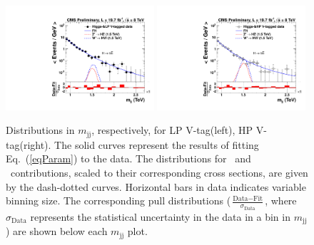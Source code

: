 \begin{figure}[th!b]
\begin{center}
\includegraphics[width=0.49\textwidth]{EXO-14-009/HbbZqqfigs/FITS/HbbVqqFitAndPullLowP.pdf}
\includegraphics[width=0.49\textwidth]{EXO-14-009/HbbZqqfigs/FITS/HbbVqqFitAndPullHighP.pdf}
\end{center}
\caption{Distributions in $m_\mathrm{jj}$, respectively, for
   LP V-tag(left), HP V-tag(right).
    The solid curves represent the
   results of fitting Eq.~(\ref{eqParam}) to the data. The
   distributions for \HbbZqq\  and \HbbWqq\
   contributions, scaled to their corresponding cross sections, are
   given by the dash-dotted curves. Horizontal bars
in data indicates variable binning size. The corresponding pull
   distributions
   ($\frac{\text{Data}-\text{Fit}}{\sigma_{\text{Data}}}$, where
   $\sigma_{\text{Data}}$ represents the statistical uncertainty in
   the data in a bin in $m_\mathrm{jj}$) are shown below each
   $m_\mathrm{jj}$ plot.}
\label{fig:HbbZqqBG}
\end{figure}



